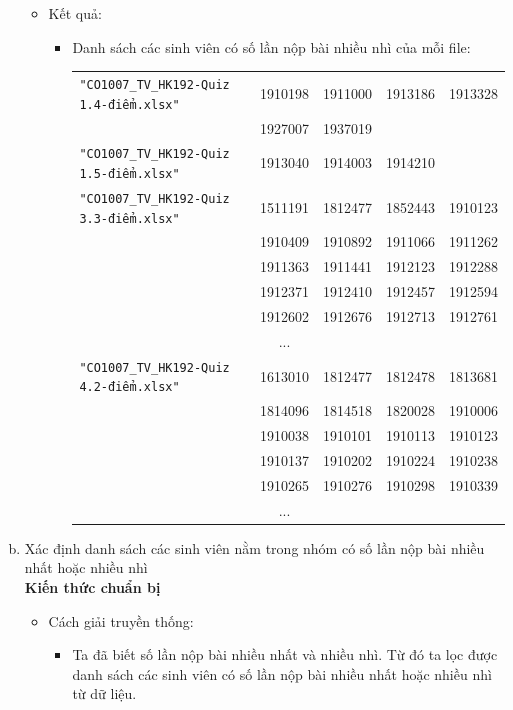 \documentclass[a4paper]{article}
\theoremstyle{definition}
\begin{document}
\begin{enumerate}[a)]
\begin{itemize}
\begin{itemize}
        \end{itemize}
        \item Kết quả:
        \begin{itemize}
            \item Danh sách các sinh viên có số lần nộp bài nhiều nhì của mỗi file:
            \begin{center}
                \begin{tabular}{l c c c c}
                     \texttt{"CO1007\_TV\_HK192-Quiz 1.4-điểm.xlsx"} & 1910198 & 1911000 & 1913186 & 1913328 \\ & 1927007 & 1937019\\
                     \texttt{"CO1007\_TV\_HK192-Quiz 1.5-điểm.xlsx"} & 1913040 & 1914003 & 1914210\\
                     \texttt{"CO1007\_TV\_HK192-Quiz 3.3-điểm.xlsx"} & 1511191 & 1812477 & 1852443 & 1910123 \\ & 1910409 & 1910892 & 1911066 & 1911262 \\ & 1911363 & 1911441 & 1912123 & 1912288 \\ & 1912371 & 1912410 & 1912457 & 1912594 \\ & 1912602 & 1912676 & 1912713 & 1912761\\
                     & ...\\
                     \texttt{"CO1007\_TV\_HK192-Quiz 4.2-điểm.xlsx"} & 1613010 & 1812477 & 1812478 & 1813681 \\ & 1814096 & 1814518 & 1820028 & 1910006 \\ & 1910038 & 1910101 & 1910113 & 1910123 \\ & 1910137 & 1910202 & 1910224 & 1910238 \\ & 1910265 & 1910276 & 1910298 & 1910339\\
                     & ...
                \end{tabular}
            \end{center}
        \end{itemize}
    \end{itemize}
    \bf\item {Xác định danh sách các sinh viên nằm trong nhóm có số lần nộp bài nhiều nhất hoặc nhiều nhì}\\[6pt]
    \bf Kiến thức chuẩn bị\normalfont
    \begin{itemize}
        \item Cách giải truyền thống:
        \begin{itemize}
            \item Ta đã biết số lần nộp bài nhiều nhất và nhiều nhì. Từ đó ta lọc được danh sách các sinh viên có số lần nộp bài nhiều nhất hoặc nhiều nhì từ dữ liệu.

\end{itemize}
\end{itemize}
\end{enumerate}
\end{document}
